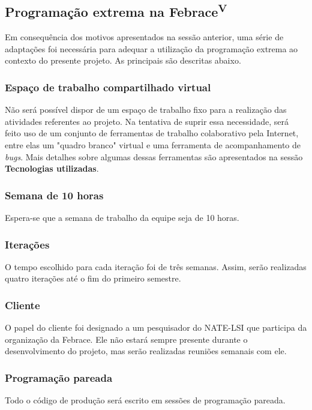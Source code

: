 \documentclass[a4paper,12pt,font=plain,header=plain]{abnt}
\begin{document}
    \subsection{Programação extrema na Febrace\textsuperscript{V}}
      Em consequência dos motivos apresentados na sessão anterior, uma série de adaptações foi necessária para adequar a utilização da programação extrema ao contexto do presente projeto. As principais são descritas abaixo.

      \subsubsection{Espaço de trabalho compartilhado virtual}
        Não será possível dispor de um espaço de trabalho fixo para a realização das atividades referentes ao projeto. Na tentativa de suprir essa necessidade, será feito uso de um conjunto de ferramentas de trabalho colaborativo pela Internet, entre elas um "quadro branco" virtual e uma ferramenta de acompanhamento de \textit{bugs}. Mais detalhes sobre algumas dessas ferramentas são apresentados na sessão \textbf{Tecnologias utilizadas}.

      \subsubsection{Semana de 10 horas}
        Espera-se que a semana de trabalho da equipe seja de 10 horas.

      \subsubsection{Iterações}
        O tempo escolhido para cada iteração foi de três semanas. Assim, serão realizadas quatro iterações até o fim do primeiro semestre.

      \subsubsection{Cliente}
        O papel do cliente foi designado a um pesquisador do NATE-LSI que participa da organização da Febrace. Ele não estará sempre presente durante o desenvolvimento do projeto, mas serão realizadas reuniões semanais com ele.

      \subsubsection{Programação pareada}
        Todo o código de produção será escrito em sessões de programação pareada.
\end{document}
